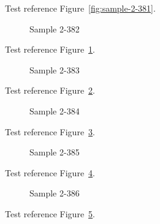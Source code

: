 Test reference Figure~\ref{fig:sample-2-381}.

\begin{figure}[tbhp]
\caption{Sample 2-382}
\label{fig:sample-2-382}
\end{figure}

Test reference Figure~\ref{fig:sample-2-382}.

\begin{figure}[tbhp]
\caption{Sample 2-383}
\label{fig:sample-2-383}
\end{figure}

Test reference Figure~\ref{fig:sample-2-383}.

\begin{figure}[tbhp]
\caption{Sample 2-384}
\label{fig:sample-2-384}
\end{figure}

Test reference Figure~\ref{fig:sample-2-384}.

\begin{figure}[tbhp]
\caption{Sample 2-385}
\label{fig:sample-2-385}
\end{figure}

Test reference Figure~\ref{fig:sample-2-385}.

\begin{figure}[tbhp]
\caption{Sample 2-386}
\label{fig:sample-2-386}
\end{figure}

Test reference Figure~\ref{fig:sample-2-386}.

